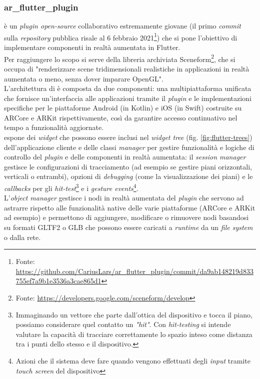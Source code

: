 \subsubsection{ar\_flutter\_plugin}
\aplug{} è un \textit{plugin open-source} collaborativo estremamente giovane (il primo \textit{commit} sulla \textit{repository} pubblica risale al 6 febbraio 2021\footnote{Fonte: \url{https://github.com/CariusLars/ar_flutter_plugin/commit/da9ab148219d833755ef7a9b1e3536a3cae865d1}}) che si pone l'obiettivo di implementare componenti in realtà aumentata in Flutter.\\
Per raggiungere lo scopo si serve della libreria archiviata Sceneform\footnote{Fonte: \url{https://developers.google.com/sceneform/develop}}, che si occupa di "renderizzare scene tridimensionali realistiche in applicazioni in realtà aumentata o meno, senza dover imparare OpenGL".\\
L'architettura di \aplug{} è composta da due componenti: una \api{} multipiattaforma unificata che fornisce un'interfaccia alle applicazioni tramite il \textit{plugin} e le implementazioni specifiche per le piattaforme Android (in Kotlin) e iOS (in Swift) costruite su ARCore e ARKit rispettivamente, così da garantire accesso continuativo nel tempo a funzionalità aggiornate.\\
\aplug{} espone dei \textit{widget} che possono essere inclusi nel \textit{widget tree} (fig. \ref{fig:flutter-trees}) dell'applicazione cliente e delle classi \textit{manager} per gestire funzionalità e logiche di controllo del \textit{plugin} e delle componenti in realtà aumentata: il \textit{session manager} gestisce le configurazioni di tracciamento (ad esempio se gestire piani orizzontali, verticali o entrambi), opzioni di \textit{debugging} (come la visualizzazione dei piani) e le \textit{callbacks} per gli \textit{hit-test}\footnote{Immaginando un vettore che parte dall'ottica del dispositivo e tocca il piano, possiamo considerare quel contatto un \textit{"hit"}. Con \textit{hit-testing} si intende valutare la capacità di tracciare correttamente lo spazio inteso come distanza tra i punti dello stesso e il dispositivo.} e i \textit{gesture events}\footnote{Azioni che il sistema deve fare quando vengono effettuati degli \textit{input} tramite \textit{touch screen} del dispositivo}.\\
L'\textit{object manager} gestisce i nodi in realtà aumentata del \textit{plugin} che servono ad astrarre rispetto alle funzionalità native delle varie piattaforme (ARCore e ARKit ad esempio) e permettono di aggiungere, modificare o rimuovere nodi basandosi su formati GLTF2 o GLB che possono essere caricati a \textit{runtime} da un \textit{file system} o dalla rete.\\
